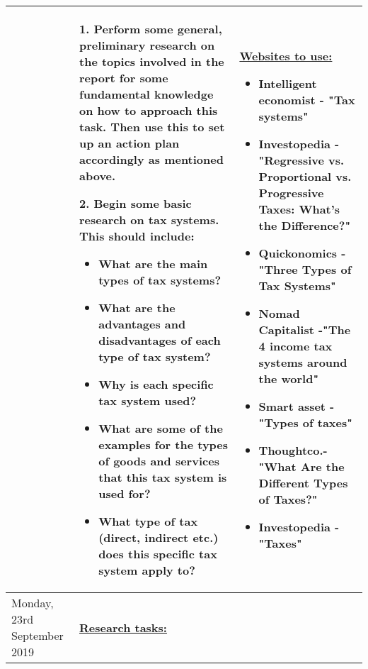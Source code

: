 \documentclass[12pt, a4paper]{article}
\newlength\combinedlength
\begin{document}
\begin{landscape}
\begin{longtable}{|m{5cm}|m{5cm}|m{5cm}|m{10.31cm}|}
			 &		
			 \multicolumn{2}{m{\combinedlength}|}{

			 	1. Perform some general, preliminary research on the topics involved in the report for some fundamental knowledge on how to approach this task. Then use this to set up an action plan accordingly as mentioned above. 
			 	\newline
			 	
			 	2. Begin some basic research on tax systems. This should include:
			 	
			 	\begin{itemize}
			 		\item What are the main types of tax systems?
			 		\item What are the advantages and disadvantages of each type of tax system?
			 		\item Why is each specific tax system used?
			 		\item What are some of the examples for the types of goods and services that this tax system is used for?
			 		\item What type of tax (direct, indirect etc.) does this specific tax system apply to?
			 	\end{itemize}
		 	
			 } & 
		 	
			\textbf{\underline{Websites to use:}}
			\newline
			
			\begin{itemize}
				\item Intelligent economist - "Tax systems"
				\item Investopedia - "Regressive vs. Proportional vs. Progressive Taxes: What's the Difference?"
				\item Quickonomics - "Three Types of Tax Systems"
				\item Nomad Capitalist -"The 4 income tax systems around the world"
				\item Smart asset - "Types of taxes"
				\item Thoughtco.- "What Are the Different Types of Taxes?"
				\item Investopedia - "Taxes"
			\end{itemize}\\
			\hline
			
			
			Monday, 23rd September 2019 &  \multicolumn{2}{m{\combinedlength}|}{
			 	
			 	\textbf{\underline{Research tasks:}}
			 	\newline
			 	
}
\end{longtable}
\end{landscape}
\end{document}
